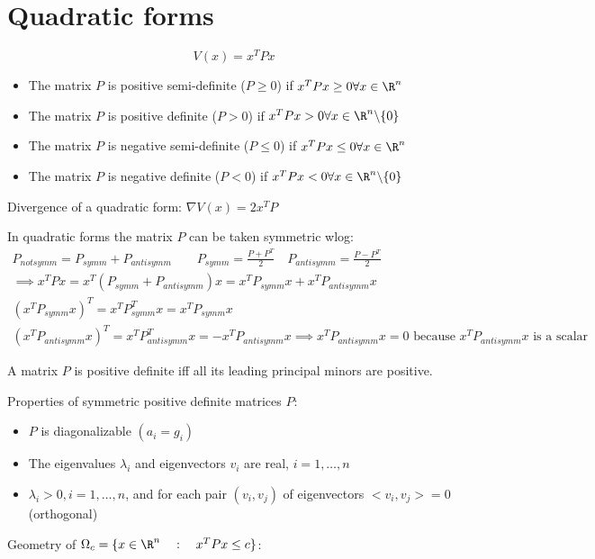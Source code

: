 \documentclass[english]{lectures}
\begin{document}
\section{Quadratic forms}
\[V(x)=x^TPx\]
\begin{definition}
    \begin{itemize}
        \item The matrix $P$ is positive semi-definite ($P\geq 0$) if $x^TPx\geq 0 \forall x \in \R^n$
        \item The matrix $P$ is positive definite ($P> 0$) if $x^TPx> 0 \forall x \in \R^n\backslash\{0\}$
        \item The matrix $P$ is negative semi-definite ($P\leq 0$) if $x^TPx\leq 0 \forall x \in \R^n$
        \item The matrix $P$ is negative definite ($P< 0$) if $x^TPx< 0 \forall x \in \R^n\backslash\{0\}$
    \end{itemize}
\end{definition}
Divergence of a quadratic form: $\nabla V(x)=2x^TP$
\begin{observation}
    In quadratic forms the matrix $P$ can be taken symmetric wlog:
    \begin{gather*}
        P_{not symm}=P_{symm}+P_{antisymm} \qquad P_{symm}=\frac{P+P^T}{2} \quad P_{antisymm}=\frac{P-P^T}{2}\\
        \implies x^TPx=x^T(P_{symm}+P_{antisymm})x=x^TP_{symm}x+x^TP_{antisymm}x\\
        (x^TP_{symm}x)^T=x^TP_{symm}^Tx=x^TP_{symm}x\\
        (x^TP_{antisymm}x)^T=x^TP_{antisymm}^Tx=-x^TP_{antisymm}x \implies x^TP_{antisymm}x=0 \text{ because } x^TP_{antisymm}x \text{ is a scalar}
    \end{gather*}
\end{observation}

\begin{result}
    A matrix $P$ is positive definite iff all its leading principal minors are positive.
\end{result}
Properties of symmetric positive definite matrices $P$:\begin{itemize}
    \item $P$ is diagonalizable $(a_i=g_i)$
    \item The eigenvalues $\lambda_i$ and eigenvectors $v_i$ are real, $i=1,\dots,n$
    \item $\lambda_i>0, i=1,\dots,n$, and for each pair $(v_i,v_j)$ of eigenvectors $<v_i,v_j>=0$ (orthogonal)
\end{itemize}
Geometry of $\Omega_c=\{x\in\R^n \quad : \quad x^TPx\leq c\}$:
\end{document}
